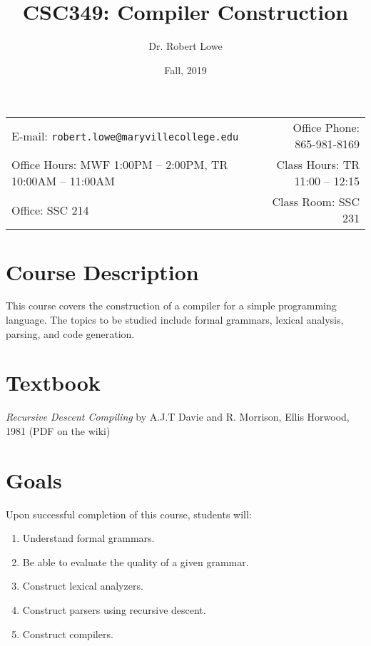 \documentclass[11pt]{article}
\title{CSC349: Compiler Construction}
\author{Dr. Robert Lowe}
\date{Fall, 2019}
\newcommand{\blankline}{\quad\pagebreak[2]}
\begin{document}
\maketitle

\blankline

\begin{tabular*}{.93\textwidth}{@{\extracolsep{\fill}}lr}


E-mail: \texttt{robert.lowe@maryvillecollege.edu} & Office Phone: 865-981-8169 \\

 Office Hours: MWF 1:00PM -- 2:00PM, TR 10:00AM -- 11:00AM  &  Class Hours: TR 11:00 -- 12:15\\

 Office: SSC 214 & Class Room: SSC 231\\
\hline
\end{tabular*}

\vspace{5 mm}


\section*{Course Description}
This course covers the construction of a compiler for a simple
programming language.  The topics to be studied include formal
grammars, lexical analysis, parsing, and code generation.


\section*{Textbook}
{\em Recursive Descent Compiling} by A.J.T Davie and R. Morrison,
Ellis Horwood, 1981 (PDF on the wiki)


\section*{Goals}
Upon successful completion of this course, students will:
\begin{enumerate}
    \item Understand formal grammars.
    \item Be able to evaluate the quality of a given grammar.
    \item Construct lexical analyzers.
    \item Construct parsers using recursive descent.
    \item Construct compilers.
\end{enumerate}
\end{document}
